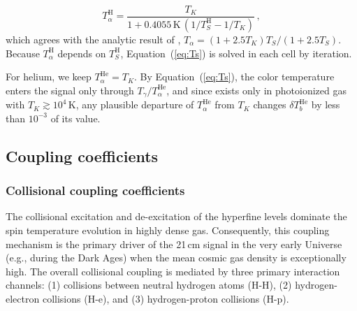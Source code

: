 \documentclass[apj,twocolumn, appendixfloats, twocolappendix, numberedappendix, tighten]{openjournal}
\begin{document}
\begin{appendix}
\begin{equation}
    T_\alpha^\mathrm{H} = \frac{T_K}{1 + 0.4055\,\mathrm{K}\,\left(1/T_S^\mathrm{H} - 1/T_K\right)}\,,
    \label{eq:Tc}
\end{equation}
which agrees with the analytic result of \citet{Chuzhoy2006}, $T_\alpha = (1 + 2.5 T_K) T_S / (1 + 2.5 T_S)$. Because $T_\alpha^\mathrm{H}$ depends on $T_S^\mathrm{H}$, Equation~(\ref{eq:Ts}) is solved in each cell by iteration. 

For helium, we keep $T^\mathrm{He}_\alpha = T_K$. By Equation~(\ref{eq:Ts}), the color temperature enters the signal only through $T_\gamma/T^{\mathrm{He}}_\alpha$, and since  exists only in photoionized gas with $T_K \gtrsim 10^4\,$K, any plausible departure of $T^\mathrm{He}_\alpha$ from $T_K$ changes $\delta T^{\mathrm{He}}_b$ by less than $10^{-3}$ of its value.







\subsection{Coupling coefficients}

\subsubsection{Collisional coupling coefficients}


The collisional excitation and de-excitation of the  hyperfine levels dominate the spin temperature evolution in highly dense gas. Consequently, this coupling mechanism is the primary driver of the 21\,cm signal in the very early Universe (e.g., during the Dark Ages) when the mean cosmic gas density is exceptionally high. The overall collisional coupling is mediated by three primary interaction channels: (1) collisions between neutral hydrogen atoms (H-H), (2) hydrogen-electron collisions (H-e), and (3) hydrogen-proton collisions (H-p).


\end{appendix}
\end{document}
